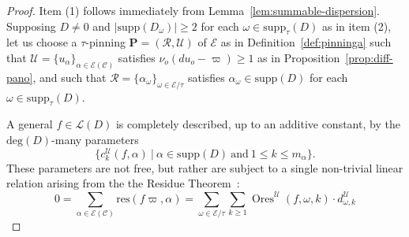 \documentclass[preprint,12pt]{elsarticle}
\numberwithin{equation}{section} %
\theoremstyle{theorem}
\theoremstyle{definition}
\newcommand{\Ca}{\mathcal{C}} %
\newcommand{\ec}{\mathcal{E}} %
\newcommand{\idec}{{o}} %
\newcommand{\orbita}{{\ec/\tau}} %
\DeclareMathOperator{\ores}{Ores}
\begin{document}
\begin{proof} Item (1) follows immediately from Lemma~\ref{lem:summable-dispersion}. Supposing $D\neq 0$ and $|\mathrm{supp}(D_\omega)|\geq 2$ for each $\omega\in\mathrm{supp}_\tau(D)$ as in item (2), let us choose a $\tau$-pinning $\mathbf{P}=(\mathcal{R},\mathcal{U})$ of $\ec$ as in Definition~\ref{def:pinninga} such that $\mathcal{U}=\{u_\alpha\}_{\alpha\in\ec(\Ca)}$ satisfies $\nu_\idec(du_\idec-\varpi)\geq 1$ as in Proposition~\ref{prop:diff-pano}, and such that $\mathcal{R}=\{\alpha_\omega\}_{\omega\in\orbita}$ satisfies $\alpha_\omega\in\mathrm{supp}(D)$ for each $\omega\in\mathrm{supp}_\tau(D)$. 

A general $f\in\mathcal{L}(D)$ is completely described, up to an additive constant, by the $\mathrm{deg}(D)$-many parameters \[\bigl\{c^\mathcal{U}_k(f,\alpha) \ \big| \ \alpha\in\mathrm{supp}(D) \ \text{and} \ 1\leq k\leq m_\alpha\bigr\}.\] These parameters are not free, but rather are subject to a single non-trivial linear relation arising from the the Residue Theorem~\cite[Thm.~III.7.14.2]{Hartshorne}:
\begin{equation}\label{eq:summable-rr-relation}0=\sum_{\alpha\in\ec(\Ca)}\mathrm{res}(f\varpi,\alpha)=   \sum_{\omega\in\orbita}\sum_{k\geq 1}\ores^\mathcal{U}(f,\omega,k)\cdot d^\mathcal{U}_{\omega,k}
\end{equation}

\end{proof}
\end{document}

